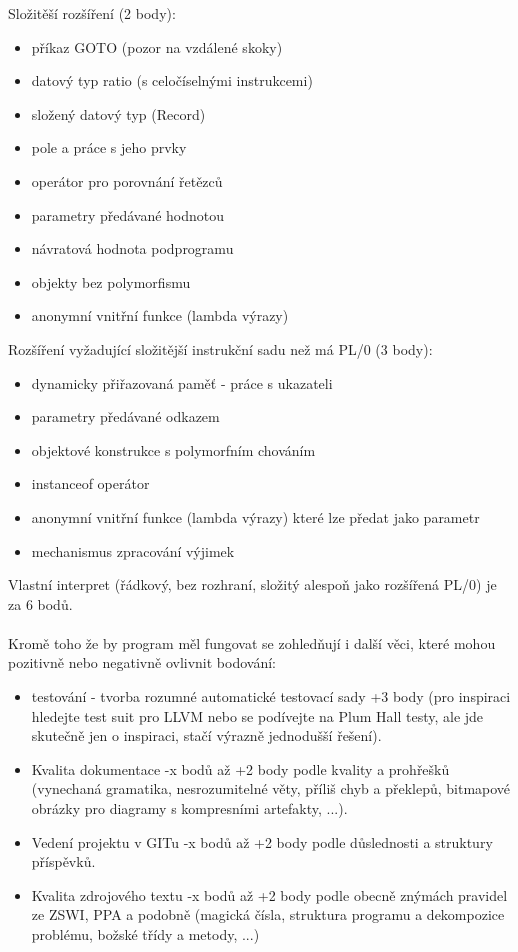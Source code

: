 \documentclass[czech, oth, kiv, he, iso690numb, viewonly]{fasthesis}
\begin{document}
Složitěší rozšíření (2 body):
\begin{itemize}
    \item příkaz GOTO (pozor na vzdálené skoky)
    \item datový typ ratio (s celočíselnými instrukcemi)
    \item složený datový typ (Record)
    \item pole a práce s jeho prvky
    \item operátor pro porovnání řetězců
    \item parametry předávané hodnotou
    \item návratová hodnota podprogramu
    \item objekty bez polymorfismu
    \item anonymní vnitřní funkce (lambda výrazy)
\end{itemize}
Rozšíření vyžadující složitější instrukční sadu než má PL/0 (3 body):
\begin{itemize}
    \item dynamicky přiřazovaná paměť - práce s ukazateli
    \item parametry předávané odkazem
    \item objektové konstrukce s polymorfním chováním
    \item instanceof operátor
    \item anonymní vnitřní funkce (lambda výrazy) které lze předat jako parametr
    \item mechanismus zpracování výjimek
\end{itemize}
Vlastní interpret (řádkový, bez rozhraní, složitý alespoň jako rozšířená PL/0) je za 6 bodů. 
\\\\Kromě toho že by program měl fungovat se zohledňují i další věci, které mohou pozitivně nebo negativně ovlivnit bodování:
\begin{itemize}
    \item testování - tvorba rozumné automatické testovací sady +3 body (pro inspiraci hledejte test suit pro LLVM nebo se podívejte na Plum Hall testy, ale jde skutečně jen o inspiraci, stačí výrazně jednodušší řešení).
    \item Kvalita dokumentace -x bodů až +2 body podle kvality a prohřešků (vynechaná gramatika, nesrozumitelné věty, příliš chyb a překlepů, bitmapové obrázky pro diagramy s kompresními artefakty, ...).
    \item Vedení projektu v GITu -x bodů až +2 body podle důslednosti a struktury příspěvků.
    \item Kvalita zdrojového textu -x bodů až +2 body podle obecně znýmách pravidel ze ZSWI, PPA a podobně (magická čísla, struktura programu a dekompozice problému, božské třídy a metody, ...)
\end{itemize}
\end{document}
